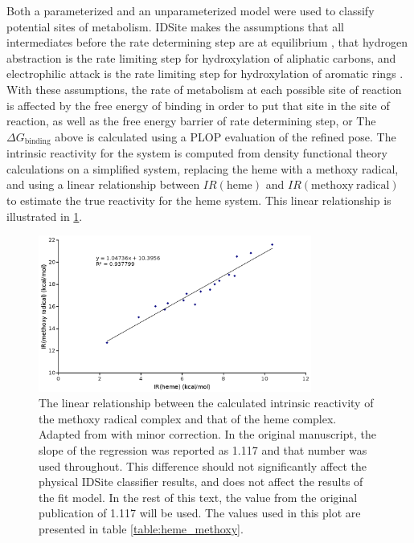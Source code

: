 Both a parameterized and an unparameterized model were used to classify potential sites of metabolism.
IDSite makes the assumptions that all intermediates before the rate determining step are at equilibrium \cite{wang2007stochastic}, that hydrogen abstraction is the rate limiting step for hydroxylation of aliphatic carbons, and electrophilic attack is the rate limiting step for hydroxylation of aromatic rings \cite{guengerich2001common,shaik2005theoretical}.
With these assumptions, the rate of metabolism at each possible site of reaction is affected by the free energy of binding in order to put that site in the site of reaction, as well as the free energy barrier of rate determining step, or
The ${\Delta}G_{\mathrm{binding}}$ above is calculated using a PLOP evaluation of the refined pose.
The intrinsic reactivity for the system is computed from density functional theory calculations on a simplified system, replacing the heme with a methoxy radical, and using a linear relationship between $IR(\mathrm{heme})$ and $IR(\mathrm{methoxy\ radical})$ to estimate the true reactivity for the heme system.
This linear relationship is illustrated in \ref{figure:idsite/intrinsic}. 
\begin{figure}[h]
\centering
\includegraphics[width=0.8\textwidth]{figures/idsite/intrinsic_corrected.png}
\caption{The linear relationship between the calculated intrinsic reactivity of the methoxy radical complex and that of the heme complex.
Adapted from \protect\cite{li2011idsite} with minor correction.
In the original manuscript, the slope of the regression was reported as 1.117 and that number was used throughout.
This difference should not significantly affect the physical IDSite classifier results, and does not affect the results of the fit model.
In the rest of this text, the value from the original publication of 1.117 will be used.
The values used in this plot are presented in table \ref{table:heme_methoxy}.}
\label{figure:idsite/intrinsic}
\end{figure}
